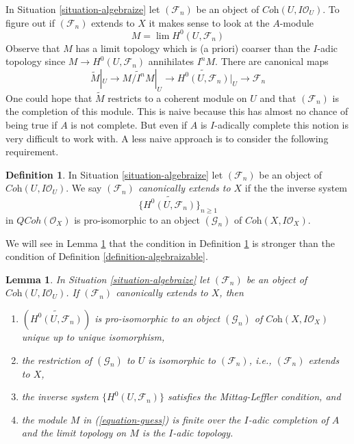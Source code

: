 \documentclass{stacks-project}
\theoremstyle{plain}
\newtheorem{lemma}[subsection]{Lemma}
\theoremstyle{definition}
\newtheorem{definition}[subsection]{Definition}
\theoremstyle{remark}
\numberwithin{equation}{subsection}
\def\lim{\mathop{\mathrm{lim}}\nolimits}
\def\QCoh{\mathit{QCoh}}
\begin{document}
\noindent
In Situation \ref{situation-algebraize} let $(\mathcal{F}_n)$ be an
object of $\textit{Coh}(U, I\mathcal{O}_U)$. To figure out if
$(\mathcal{F}_n)$ extends to $X$ it makes sense to look at the $A$-module
\begin{equation}
\label{equation-guess}
M = \lim H^0(U, \mathcal{F}_n)
\end{equation}
Observe that $M$ has a limit topology which is (a priori) coarser than
the $I$-adic topology since $M \to H^0(U, \mathcal{F}_n)$ annihilates $I^nM$.
There are canonical maps
$$
\widetilde{M}|_U \to \widetilde{M/I^nM}|_U \to
\widetilde{H^0(U, \mathcal{F}_n)}|_U \to
\mathcal{F}_n
$$
One could hope that $\widetilde{M}$ restricts to a coherent module
on $U$ and that $(\mathcal{F}_n)$ is the completion of this module.
This is naive because this has almost no chance of being true
if $A$ is not complete. But even if $A$ is $I$-adically complete
this notion is very difficult to work with.
A less naive approach is to consider the following requirement.

\begin{definition}
\label{definition-canonically-algebraizable}
In Situation \ref{situation-algebraize} let $(\mathcal{F}_n)$ be an
object of $\textit{Coh}(U, I\mathcal{O}_U)$. We say
{\it $(\mathcal{F}_n)$ canonically extends to $X$} if the the
inverse system
$$
\{\widetilde{H^0(U, \mathcal{F}_n)}\}_{n \geq 1}
$$
in $\QCoh(\mathcal{O}_X)$ is pro-isomorphic to an object
$(\mathcal{G}_n)$ of $\textit{Coh}(X, I\mathcal{O}_X)$.
\end{definition}

\noindent
We will see in Lemma \ref{lemma-canonically-algebraizable}
that the condition in Definition \ref{definition-canonically-algebraizable}
is stronger than the condition of Definition \ref{definition-algebraizable}.

\begin{lemma}
\label{lemma-canonically-algebraizable}
In Situation \ref{situation-algebraize} let $(\mathcal{F}_n)$ be an
object of $\textit{Coh}(U, I\mathcal{O}_U)$. If $(\mathcal{F}_n)$
canonically extends to $X$, then
\begin{enumerate}
\item $(\widetilde{H^0(U, \mathcal{F}_n)})$ is pro-isomorphic to an
object $(\mathcal{G}_n)$ of $\textit{Coh}(X, I \mathcal{O}_X)$
unique up to unique isomorphism,
\item the restriction of $(\mathcal{G}_n)$ to $U$ is isomorphic
to $(\mathcal{F}_n)$, i.e., $(\mathcal{F}_n)$ extends to $X$,
\item the inverse system $\{H^0(U, \mathcal{F}_n)\}$
satisfies the Mittag-Leffler condition, and
\item the module $M$ in (\ref{equation-guess}) is finite over the
$I$-adic completion of $A$ and the limit topology on
$M$ is the $I$-adic topology.
\end{enumerate}
\end{lemma}
\end{document}
